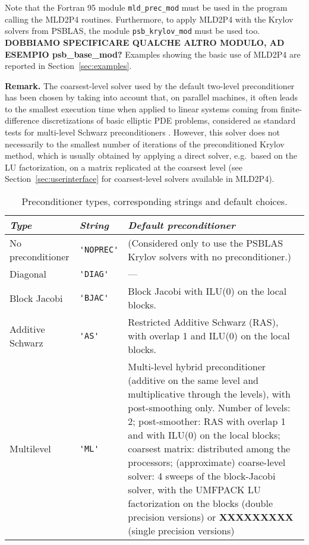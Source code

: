 Note that the Fortran 95 module \verb|mld_prec_mod| must be used in the program
calling the MLD2P4 routines. Furthermore, to apply MLD2P4 with the Krylov solvers
from PSBLAS, the module \verb|psb_krylov_mod| must be used too.
\textbf{DOBBIAMO SPECIFICARE QUALCHE ALTRO MODULO, AD ESEMPIO psb\_base\_mod?}
Examples showing the basic use of MLD2P4 are reported in Section~\ref{sec:examples}.

\noindent
\textbf{Remark.} The coarsest-level solver used by the default two-level
preconditioner has been chosen by taking into account that, on parallel
machines, it often leads to the smallest execution time when applied to
linear systems coming from finite-difference discretizations of basic
elliptic PDE problems, considered as standard tests for multi-level Schwarz
preconditioners \cite{aaecc_07,apnum_07}. However, this solver does
not necessarily  to the smallest number of iterations of the
preconditioned Krylov method, which is usually obtained by applying a
direct solver, e.g.\ based on the LU factorization, on a matrix
replicated at the coarsest level (see Section~\ref{sec:userinterface}
for coarsest-level solvers available in MLD2P4). 

\begin{table}[th]
{
\begin{center}
\begin{tabular}{|l|l|p{6.7cm}|}
\hline
\emph{Type}       & \emph{String} & \emph{Default preconditioner} \\ \hline
No preconditioner &\verb|'NOPREC'|& (Considered only to use the PSBLAS
                                    Krylov solvers with no preconditioner.) \\
Diagonal          & \verb|'DIAG'| & --- \\
Block Jacobi      & \verb|'BJAC'| & Block Jacobi with ILU(0) on the local blocks.\\ 
Additive Schwarz  & \verb|'AS'|   & Restricted Additive Schwarz (RAS),
                                    with overlap 1 and ILU(0) on the local blocks. \\ 
Multilevel        &\verb|'ML'|    & Multi-level hybrid preconditioner (additive on the
                                    same level and multiplicative through the levels),
                                    with post-smoothing only. Number of levels: 2;
                                    post-smoother: RAS with overlap 1 and with ILU(0)
                                    on the local blocks; coarsest matrix: distributed 
                                    among the processors; (approximate) coarse-level
                                    solver: 4 sweeps of the block-Jacobi solver, 
                                    with the UMFPACK LU factorization
                                    on the blocks (double precision versions) or
                                    \textbf{XXXXXXXXX} (single precision versions)\\
\hline
\end{tabular}
\end{center}
}
\caption{Preconditioner types, corresponding strings and default choices.
\label{tab:precinit}}
\end{table}

